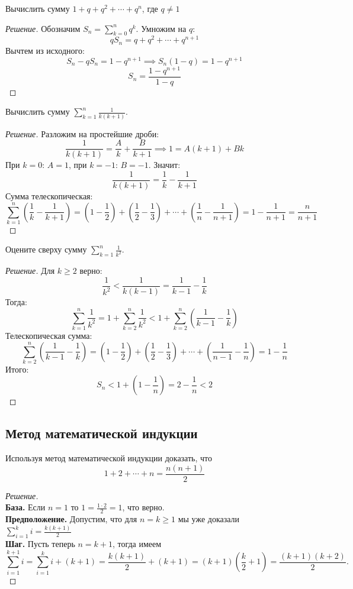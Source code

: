 \begin{problem}
    Вычислить сумму \(1 + q + q^2 + \cdots + q^n\), где \(q \neq 1\)
\end{problem}
\begin{proof}[Решение]
Обозначим \(S_n = \sum_{k=0}^{n} q^k\). Умножим на \(q\):
\[
qS_n = q + q^2 + \cdots + q^{n+1}
\]
Вычтем из исходного:
\[
S_n - qS_n = 1 - q^{n+1} \implies S_n(1 - q) = 1 - q^{n+1}
\]
\[
S_n = \frac{1 - q^{n+1}}{1 - q}
\]    
\end{proof}


\begin{problem}
 Вычислить сумму \(\sum_{k=1}^{n} \frac{1}{k(k+1)}\).
\end{problem}
\begin{proof}[Решение]
 Разложим на простейшие дроби:
\[
\frac{1}{k(k+1)} = \frac{A}{k} + \frac{B}{k+1} \implies 1 = A(k+1) + Bk
\]
При \(k=0\): \(A = 1\), при \(k=-1\): \(B = -1\). Значит:
\[
\frac{1}{k(k+1)} = \frac{1}{k} - \frac{1}{k+1}
\]
Сумма телескопическая:
\[
\sum_{k=1}^{n} \left( \frac{1}{k} - \frac{1}{k+1} \right) = \left(1 - \frac{1}{2}\right) + \left(\frac{1}{2} - \frac{1}{3}\right) + \cdots + \left(\frac{1}{n} - \frac{1}{n+1}\right) = 1 - \frac{1}{n+1} = \frac{n}{n+1}
\]    
\end{proof}


\begin{problem}
    Оцените сверху сумму \(\sum_{k=1}^{n} \frac{1}{k^2}.\) 
\end{problem}
\begin{proof}[Решение]
Для \(k \geq 2\) верно:
\[
\frac{1}{k^2} < \frac{1}{k(k-1)} = \frac{1}{k-1} - \frac{1}{k}
\]
Тогда:
\[
\sum_{k=1}^{n} \frac{1}{k^2} = 1 + \sum_{k=2}^{n} \frac{1}{k^2} < 1 + \sum_{k=2}^{n} \left( \frac{1}{k-1} - \frac{1}{k} \right)
\]
Телескопическая сумма:
\[
\sum_{k=2}^{n} \left( \frac{1}{k-1} - \frac{1}{k} \right) = \left(1 - \frac{1}{2}\right) + \left(\frac{1}{2} - \frac{1}{3}\right) + \cdots + \left(\frac{1}{n-1} - \frac{1}{n}\right) = 1 - \frac{1}{n}
\]
Итого:
\[
S_n < 1 + \left(1 - \frac{1}{n}\right) = 2 - \frac{1}{n} < 2
\]    
\end{proof}

\subsection{Метод математической индукции}


\begin{problem}
Используя метод математической индукции доказать, что 
\[
1 + 2 + \cdots + n = \frac{n(n+1)}{2}
\]
\end{problem}
\begin{proof}[Решение]~\\
\textbf{База.} Если \(n=1\) то \(1 = \frac{1 \cdot 2}{2} = 1\), что верно. \\
\textbf{Предположение.} Допустим, что для \(n=k \ge 1\) мы уже доказали \(\sum_{i=1}^{k} i = \frac{k(k+1)}{2}\) \\
\textbf{Шаг.} Пусть теперь \(n=k+1\), тогда имеем
\[
\sum_{i=1}^{k+1} i = \sum_{i=1}^{k} i + (k+1) = \frac{k(k+1)}{2} + (k+1) = (k+1) \left( \frac{k}{2} + 1 \right) = \frac{(k+1)(k+2)}{2}.
\]    
\end{proof}


